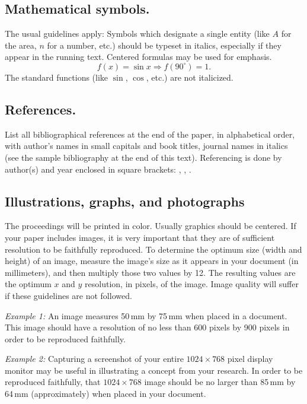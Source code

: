 \documentclass[twoside]{article}
\begin{document}
\subsection{Mathematical symbols.}

The usual guidelines apply: Symbols which designate a single entity (like 
$A$ for the area, $n$ for a number, etc.) should be typeset in italics, 
especially if they appear in the running text. Centered formulas may be 
used for emphasis.
	$$ f(x)=\sin x \Longrightarrow f(90^\circ)=1. $$
 The standard functions (like $\sin$, $\cos$, etc.) are not italicized.


\subsection{References.}

List all bibliographical references at the end of the paper, in 
alphabetical order, with author's names in small capitals and book titles, 
journal names in italics (see the sample bibliography at the end of this 
text). Referencing is done by author(s) and year enclosed in square 
brackets:  \cite{dandelin-1822}, \cite{chusequin:2002}, 
\cite{pauly-2008-sr}.

\subsection{Illustrations, graphs, and photographs}

The proceedings will be printed in color. Usually graphics should be 
centered. If your paper includes images, it is very important that they 
are of sufficient resolution to be faithfully reproduced. To determine the 
optimum size (width and height) of an image, measure the image's size as 
it appears in your document (in millimeters), and then multiply those two 
values by 12. The resulting values are the optimum $x$ and $y$ resolution, 
in pixels, of the image. Image quality will suffer if these guidelines are 
not followed.

{\em Example 1:} An image measures 50\,mm by 75\,mm when placed in a 
document. This image should have a resolution of no less than 600 pixels 
by 900 pixels in order to be reproduced faithfully.

{\em Example 2:} Capturing a screenshot of your entire $1024 \times 768$ 
pixel display monitor may be useful in illustrating a concept from your 
research. In order to be reproduced faithfully, that $1024 \times 768$ 
image should be no larger than 85\,mm by 64\,mm (approximately) when 
placed in your document.
\end{document}
